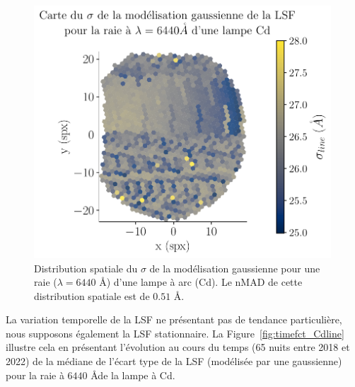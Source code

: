 \documentclass[../main/main.tex]{subfiles}
\begin{document}
\begin{figure}[ht]
  \begin{minipage}[c]{0.55\textwidth}
    \includegraphics[width=0.99\textwidth]{../figures/06_irf/mapsigmaCd.pdf}
  \end{minipage}\hfill
  \begin{minipage}[c]{0.43\textwidth}
    \caption[Distribution spatiale de la LSF pour une raie d'une lampe à
    arc.]{Distribution spatiale du $\sigma$ de la modélisation
      gaussienne pour une raie ($\lambda=6440$ \AA) d'une lampe à arc
      (Cd). Le nMAD de cette distribution spatiale est de $0.51$ \AA.}\label{fig:mapsigmaCd}
  \end{minipage}
\end{figure}

La variation temporelle de la LSF ne présentant pas de tendance
particulière, nous supposons également la LSF stationnaire. La
Figure~\ref{fig:timefct_Cdline} illustre cela en présentant l'évolution
au cours du temps (65 nuits entre 2018 et 2022) de la médiane de l'écart type de la LSF (modélisée par
une gaussienne) pour la raie à $6440$ \AA de la lampe à Cd.
\end{document}
